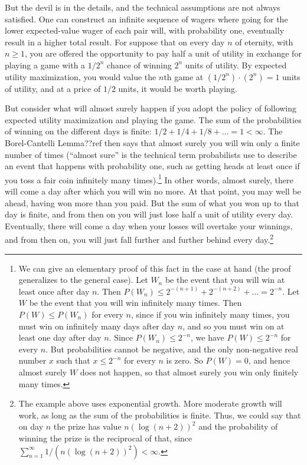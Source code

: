 But the devil is in the details, and the technical assumptions are not always satisfied. One can construct an infinite
sequence of wagers where going for the lower expected-value wager of each pair will, with probability one, eventually
result in a higher total result. For suppose that on every day $n$ of
eternity, with $n\ge 1$, you are offered the opportunity to pay half a unit of utility in exchange for playing a game with a 
$1/2^n$ chance of winning $2^n$ units of utility. By expected utility maximization, you would value the $n$th game at
$(1/2^n)\cdot (2^n)=1$ units of utility, and at a price of $1/2$ units, it would be worth playing. 

But consider what will almost surely happen if you adopt the policy of following expected utility maximization and playing the game. The sum of the probabilities of winning on the different days is finite: 
$1/2+1/4+1/8+\dots=1<\infty$. The Borel-Cantelli Lemma??ref then says that almost surely you will win only a finite number of times
(``almost sure'' is the technical term probabilists use to describe an event that happens with probability one, such as 
getting heads at least once if you toss a fair coin infinitely many times).\footnote{We 
can give an elementary proof of this fact in the case at hand (the proof generalizes to the general case). Let $W_n$ be the event that you will win at least once after day $n$. 
Then $P(W_n)\le 2^{-(n+1)}+2^{-(n+2)}+\dots = 2^{-n}$. Let $W$ be the event that you will win infinitely many times. Then $P(W)\le P(W_n)$ for
every $n$, since if you win infinitely many times, you must win on infinitely many days after day $n$, and so you must win on at least one
day after day $n$. Since $P(W_n) \le 2^{-n}$, we have $P(W) \le 2^{-n}$ for every $n$. But probabilities cannot be negative, and the only 
non-negative real number $x$ such that $x \le 2^{-n}$ for every $n$ is zero. So $P(W)=0$, and hence almost surely $W$ does not happen,
so that almost surely you win only finitely many times.} In other words, almost surely, there will come a day after which you will win no more. At that point, you may well be ahead,
having won more than you paid. But the sum of what you won up to that day is finite, and from then on you will just lose half a unit of utility every 
day. Eventually, there will come a day when your losses will overtake your winnings, and from then on, you will just fall further and further
behind every day.\footnote{The example above uses exponential growth. More moderate growth will work, as long as the sum of the probabilities
is finite. Thus, we could say that on day $n$ the prize has value $n (\log (n+2))^2$ and the probability of winning the prize is the reciprocal
of that, since $\sum_{n=1}^\infty 1/(n (\log (n+2))^2)<\infty$.}

